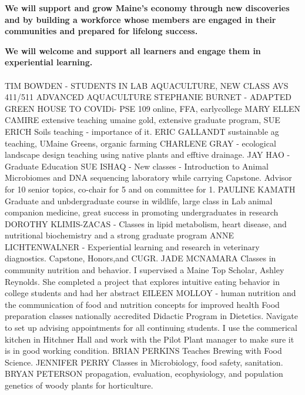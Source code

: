 \documentclass[11pt]{article}
\begin{document}
\begin{description}[topsep=0pt, noitemsep]
\item[\textbf {1.}] \textbf{We will support and grow Maine’s economy through new discoveries and by building a workforce whose members are engaged in their communities and prepared for lifelong success.}
\begin{description}[topsep=11pt, noitemsep]
\item[\textbf{1.1}] \textbf{We will welcome and support all learners and engage them in experiential learning.}\\~\\
	TIM BOWDEN - STUDENTS IN LAB AQUACULTURE, NEW CLASS AVS 411/511 ADVANCED AQUACULTURE 
	STEPHANIE BURNET - ADAPTED GREEN HOUSE TO COVIDi- PSE 109 online, FFA, earlycollege
MARY ELLEN CAMIRE extensive teaching umaine gold, extensive graduate program, 	
SUE ERICH Soils teaching - importance of it.
ERIC GALLANDT sustainable ag teaching, UMaine Greens, organic farming
CHARLENE GRAY - ecological landscape design teaching using native plants and efftive drainage. 
JAY HAO -Graduate Education
SUE ISHAQ - New classes - Introduction to Animal Microbiomes and DNA sequencing laboratory while carrying Capstone.  Advisor for 10  senior topics, co-chair for 5 and on committee for 1. 
PAULINE KAMATH Graduate and unbdergraduate course in wildlife, large class in Lab animal companion medicine, great success in promoting undergraduates in research 
DOROTHY KLIMIS-ZACAS - Classes in lipid metabolism, heart disease, and nutritional biochemistry and a strong graduate program
ANNE LICHTENWALNER - Experiential learning and research in veterinary diagnostics. Capstone, Honors,and CUGR.	 
JADE MCNAMARA Classes in community nutrition and behavior. I supervised a Maine Top Scholar, Ashley Reynolds. She completed a project that explores intuitive eating behavior in college students and had her abstract
EILEEN MOLLOY - human nutrition and the communication of food and nutrition concepts for improved health Food preparation classes nationally accredited Didactic Program in Dietetics. Navigate to set up advising appointments for all continuing students. I use the commerical kitchen in Hitchner Hall and work with the Pilot Plant manager to make sure it is in good working condition. 
BRIAN PERKINS Teaches Brewing with Food Science.
JENNIFER PERRY Classes in Microbiology,  food safety, sanitation.
BRYAN PETERSON propagation, evaluation, ecophysiology, and population genetics of woody plants for horticulture. 

\end{description}
\end{description}
\end{document}
